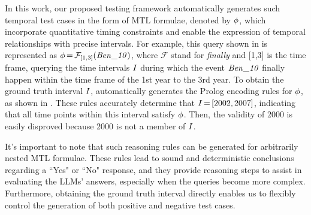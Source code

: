 In this work, our proposed testing framework automatically generates such temporal test cases in the form of MTL formulae, denoted by $\phi$, which incorporate quantitative timing constraints and enable the expression of temporal relationships with precise intervals.   
For example, this query shown in  is represented as  
$\phi {\,=\,} \mathcal{F}_{[1, 3]}(\mathit{Ben\_10})$, where $\mathcal{F}$ stand for \emph{finally} and [1,3] is the time frame, querying the time intervals $I$ during which the event $\mathit{Ben\_10}$ finally happen within the time frame of the 1st year to the 3rd year. 
To obtain the ground truth interval $I$, \tool{} automatically generates the Prolog encoding rules for $\phi$, as shown in . These rules accurately determine that $I{\,=\,}[2002,2007]$, indicating that all time points within this interval satisfy $\phi$. 
Then, the validity of 2000 is easily disproved because 2000 is not a member of $I$. 

It's important to note that such reasoning rules can be generated for arbitrarily nested MTL formulae. These rules lead to sound and deterministic conclusions regarding a ``Yes" or ``No" response, and they provide reasoning steps to assist in evaluating the LLMs' answers, especially when the queries become more complex. 
Furthermore, obtaining the ground truth interval directly enables us to flexibly control the generation of both positive and negative test cases. 







